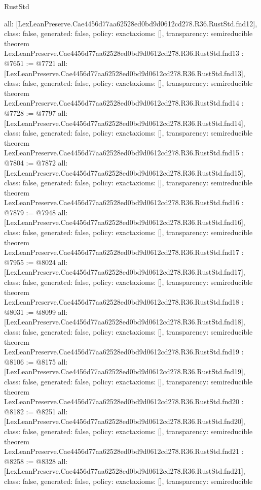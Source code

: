 \begin{lexlean}{RustStd}
\begin{coremodule}
{  all: [LexLeanPreserve.Cae4456d77aa62528ed0bd9d0612cd278.R36.RustStd.fnd12],
  class: false,
  generated: false,
  policy: exact{axioms: []},
  transparency: semireducible
}
theorem LexLeanPreserve.Cae4456d77aa62528ed0bd9d0612cd278.R36.RustStd.fnd13 : @7651 := @7721 {
  all: [LexLeanPreserve.Cae4456d77aa62528ed0bd9d0612cd278.R36.RustStd.fnd13],
  class: false,
  generated: false,
  policy: exact{axioms: []},
  transparency: semireducible
}
theorem LexLeanPreserve.Cae4456d77aa62528ed0bd9d0612cd278.R36.RustStd.fnd14 : @7728 := @7797 {
  all: [LexLeanPreserve.Cae4456d77aa62528ed0bd9d0612cd278.R36.RustStd.fnd14],
  class: false,
  generated: false,
  policy: exact{axioms: []},
  transparency: semireducible
}
theorem LexLeanPreserve.Cae4456d77aa62528ed0bd9d0612cd278.R36.RustStd.fnd15 : @7804 := @7872 {
  all: [LexLeanPreserve.Cae4456d77aa62528ed0bd9d0612cd278.R36.RustStd.fnd15],
  class: false,
  generated: false,
  policy: exact{axioms: []},
  transparency: semireducible
}
theorem LexLeanPreserve.Cae4456d77aa62528ed0bd9d0612cd278.R36.RustStd.fnd16 : @7879 := @7948 {
  all: [LexLeanPreserve.Cae4456d77aa62528ed0bd9d0612cd278.R36.RustStd.fnd16],
  class: false,
  generated: false,
  policy: exact{axioms: []},
  transparency: semireducible
}
theorem LexLeanPreserve.Cae4456d77aa62528ed0bd9d0612cd278.R36.RustStd.fnd17 : @7955 := @8024 {
  all: [LexLeanPreserve.Cae4456d77aa62528ed0bd9d0612cd278.R36.RustStd.fnd17],
  class: false,
  generated: false,
  policy: exact{axioms: []},
  transparency: semireducible
}
theorem LexLeanPreserve.Cae4456d77aa62528ed0bd9d0612cd278.R36.RustStd.fnd18 : @8031 := @8099 {
  all: [LexLeanPreserve.Cae4456d77aa62528ed0bd9d0612cd278.R36.RustStd.fnd18],
  class: false,
  generated: false,
  policy: exact{axioms: []},
  transparency: semireducible
}
theorem LexLeanPreserve.Cae4456d77aa62528ed0bd9d0612cd278.R36.RustStd.fnd19 : @8106 := @8175 {
  all: [LexLeanPreserve.Cae4456d77aa62528ed0bd9d0612cd278.R36.RustStd.fnd19],
  class: false,
  generated: false,
  policy: exact{axioms: []},
  transparency: semireducible
}
theorem LexLeanPreserve.Cae4456d77aa62528ed0bd9d0612cd278.R36.RustStd.fnd20 : @8182 := @8251 {
  all: [LexLeanPreserve.Cae4456d77aa62528ed0bd9d0612cd278.R36.RustStd.fnd20],
  class: false,
  generated: false,
  policy: exact{axioms: []},
  transparency: semireducible
}
theorem LexLeanPreserve.Cae4456d77aa62528ed0bd9d0612cd278.R36.RustStd.fnd21 : @8258 := @8328 {
  all: [LexLeanPreserve.Cae4456d77aa62528ed0bd9d0612cd278.R36.RustStd.fnd21],
  class: false,
  generated: false,
  policy: exact{axioms: []},
  transparency: semireducible
}
\end{coremodule}
\end{lexlean}
